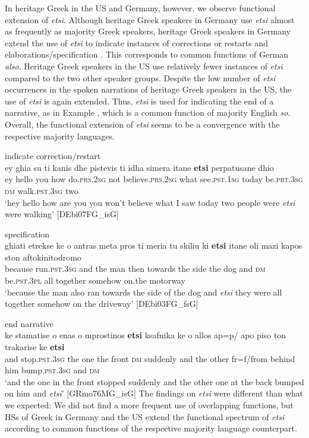 \documentclass[output=paper,colorlinks,citecolor=brown]{langscibook}
\begin{document}
\noindent In heritage Greek in the US and Germany, however, we observe functional extension of \textit{etsi}. Although heritage Greek speakers in Germany use \textit{etsi} almost as frequently as majority Greek speakers, heritage Greek speakers in Germany extend the use of \textit{etsi} to indicate instances of corrections or restarts  and elaborations/specification . This corresponds to common functions of German \textit{also}.
Heritage Greek speakers in the US use relatively fewer instances of \textit{etsi} compared to the two other speaker groups. Despite the low number of \textit{etsi} occurrences in the spoken narrations of heritage Greek speakers in the US, the use of \textit{etsi} is again extended. Thus, \textit{etsi} is used for indicating the end of a narrative, as in Example  , which is a common function of majority English \textit{so}. Overall, the functional extension of \textit{etsi} seems to be a convergence with the respective majority languages.

\ea indicate correction\slash restart \label{ex:labrenzetal:26} \\
\gll ey ghia su ti kanis dhe pistevis ti idha simera itane \textbf{etsi} perpatusane dhio \\ ey hello you how do.\textsc{prs.2sg} not believe.\textsc{prs.2sg} what see.\textsc{pst.1sg} today be.\textsc{prt.3sg} \textsc{dm} walk.\textsc{pst.3sg} two\\
\glt ‘hey hello how are you you won’t believe what I saw today two people were \textit{etsi} were walking’  \hfill[DEbi07FG\_isG]
\z

\ea specification \label{ex:labrenzetal:27} \\
\gll ghiati etrekse ke o antras meta pros ti meria tu skiliu ki \textbf{etsi} itane oli mazi kapos ston aftokinitodromo \\ because run.\textsc{pst.3sg} and the man then towards the side the dog and \textsc{dm} be.\textsc{pst.3pl} all together somehow on.the motorway\\
\glt ‘because the man also ran towards the side of the dog and \textit{etsi} they were all together somehow on the driveway’ \hfill[DEbi03FG\_fsG]
\z

\ea end narrative \label{ex:labrenzetal:28} \\
\gll ke stamatise o enas o mprostinos \textbf{etsi} ksafnika ke o allos {ap=p/ apo} piso ton trakarise ke \textbf{etsi} \\ and stop.\textsc{pst.3sg} the one the front \textsc{dm} suddenly and the other {fr=f/from} behind him bump.\textsc{pst.3sg} and \textsc{dm}\\
\glt ‘and the one in the front stopped suddenly and the other one at the back bumped on him and \textit{etsi}’ \hfill[GRmo76MG\_isG]
\z
The findings on \textit{etsi} were different than what we expected: We did not find a more frequent use of overlapping functions, but HSs of Greek in Germany and the US extend the functional spectrum of \textit{etsi} according to common functions of the respective majority language counterpart.
\end{document}
